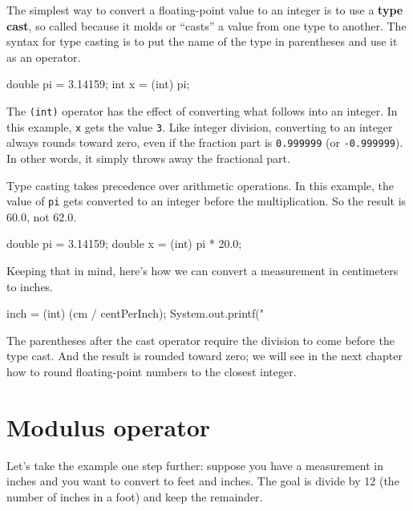 \documentclass[12pt]{book}
\theoremstyle{exercise}
\newcommand{\java}[1]{\verb"#1"}
\begin{document}

The simplest way to convert a floating-point value to an integer is to use a {\bf type cast}, so called because it molds or ``casts'' a value from one type to another.
The syntax for type casting is to put the name of the type in parentheses and use it as an operator.

\begin{code}
    double pi = 3.14159;
    int x = (int) pi;
\end{code}

The \java{(int)} operator has the effect of converting what follows into an integer.
In this example, \java{x} gets the value \java{3}.
Like integer division, converting to an integer always rounds toward zero, even if the fraction part is \java{0.999999} (or \java{-0.999999}).
In other words, it simply throws away the fractional part.

Type casting takes precedence over arithmetic operations.
In this example, the value of \java{pi} gets converted to an integer before the multiplication.
So the result is 60.0, not 62.0.

\begin{code}
    double pi = 3.14159;
    double x = (int) pi * 20.0;
\end{code}


Keeping that in mind, here's how we can convert a measurement in centimeters to inches.

\begin{code}
    inch = (int) (cm / centPerInch);
    System.out.printf("%
\end{code}

The parentheses after the cast operator require the division to come before the type cast.
And the result is rounded toward zero; we will see in the next chapter how to round floating-point numbers to the closest integer.


\section{Modulus operator}

Let's take the example one step further: suppose you have a measurement in inches and you want to convert to feet and inches.
The goal is divide by 12 (the number of inches in a foot) and keep the remainder.
\end{document}

